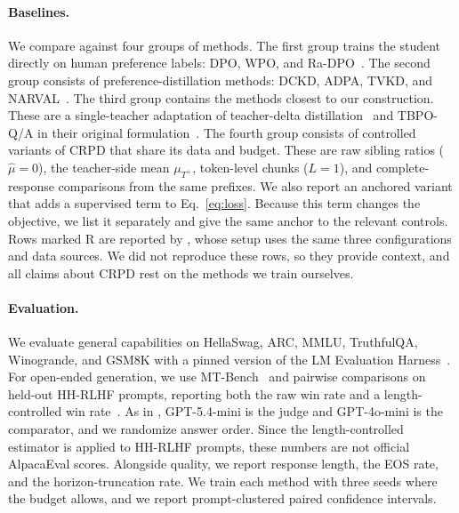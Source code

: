 \documentclass[pdflatex,sn-mathphys-num,review]{sn-jnl}
\theoremstyle{thmstyleone}
\theoremstyle{thmstyletwo}
\theoremstyle{thmstylethree}
\providecommand{\Tp}{T^{+}}
\providecommand{\muhat}{\widehat{\mu}}
\begin{document}
\paragraph{Baselines.}
We compare against four groups of methods. The first group trains the student directly on human preference labels: DPO, WPO, and Ra-DPO~\citep{rafailov2023direct,zhou2024wpo,zhang2025radpo}. The second group consists of preference-distillation methods: DCKD, ADPA, TVKD, and NARVAL~\citep{gao2025advantage,kwon2025preference,van2026narval}. %
The third group contains the methods closest to our construction. These are a single-teacher adaptation of teacher-delta distillation~\citep{sang2026composing,heo2026opd} and TBPO-Q/A in their original formulation~\citep{nguyen2026tokenratio}. The fourth group consists of controlled variants of CRPD that share its data and budget. These are raw sibling ratios ($\muhat=0$), the teacher-side mean $\mu_{\Tp}$, token-level chunks ($L=1$), and complete-response comparisons from the same prefixes. We also report an anchored variant that adds a supervised term to Eq.~\eqref{eq:loss}. Because this term changes the objective, we list it separately and give the same anchor to the relevant controls. Rows marked R are reported by \citet{van2026narval}, whose setup uses the same three configurations and data sources. We did not reproduce these rows, so they provide context, and all claims about CRPD rest on the methods we train ourselves.

\paragraph{Evaluation.}
We evaluate general capabilities on HellaSwag, ARC, MMLU, TruthfulQA, Winogrande, and GSM8K with a pinned version of the LM Evaluation Harness~\citep{eval-harness}. For open-ended generation, we use MT-Bench~\citep{zheng2023judging} and pairwise comparisons on held-out HH-RLHF prompts, reporting both the raw win rate and a length-controlled win rate~\citep{dubois2024length}. As in \citet{van2026narval}, GPT-5.4-mini is the judge and GPT-4o-mini is the comparator, and we randomize answer order. Since the length-controlled estimator is applied to HH-RLHF prompts, these numbers are not official AlpacaEval scores. Alongside quality, we report response length, the EOS rate, and the horizon-truncation rate. We train each method with three seeds where the budget allows, and we report prompt-clustered paired confidence intervals.
\end{document}
